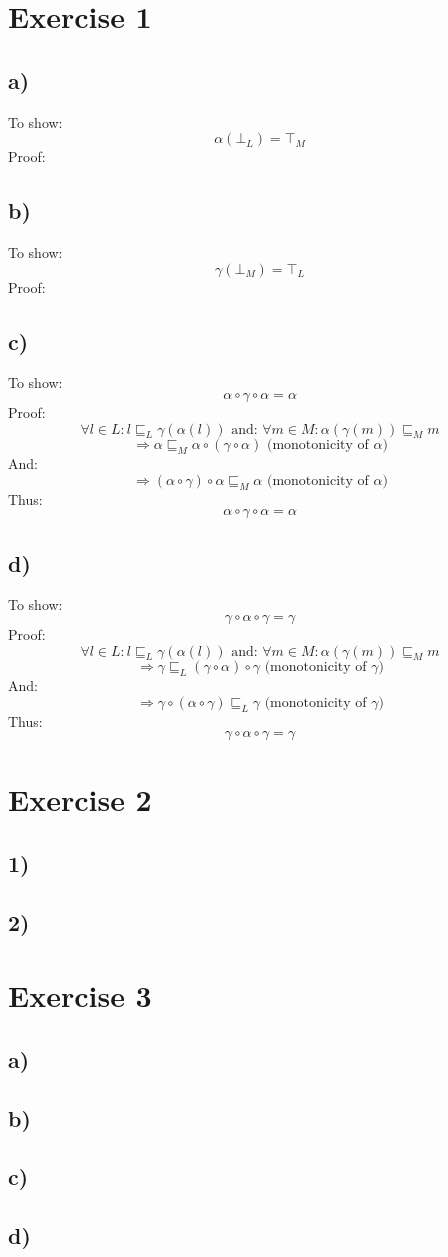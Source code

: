 \documentclass[fleqn,12pt]{article}
\begin{document}
\section*{Exercise 1}
\subsection*{a)}
To show:
$$\alpha(\bot_L) = \top_M$$
Proof:
\subsection*{b)}
To show:
$$\gamma(\bot_M) = \top_L$$
Proof:

\subsection*{c)}
To show:
$$\alpha \circ \gamma \circ \alpha = \alpha$$
Proof:
$$\forall l \in L: l \sqsubseteq_{L} \gamma(\alpha(l)) \text{ and: } \forall m \in M: \alpha(\gamma(m)) \sqsubseteq_{M} m$$
$$\Rightarrow \alpha \sqsubseteq_M \alpha \circ (\gamma \circ \alpha) \text{ (monotonicity of $\alpha$)}$$
And:
$$\Rightarrow (\alpha \circ \gamma) \circ \alpha \sqsubseteq_M \alpha \text{ (monotonicity of $\alpha$)}$$
Thus:
$$\alpha \circ \gamma \circ \alpha = \alpha$$
\subsection*{d)}
To show:
$$\gamma \circ \alpha \circ \gamma = \gamma$$
Proof:
$$\forall l \in L: l \sqsubseteq_{L} \gamma(\alpha(l)) \text{ and: } \forall m \in M: \alpha(\gamma(m)) \sqsubseteq_{M} m$$
$$\Rightarrow \gamma \sqsubseteq_L (\gamma \circ \alpha) \circ \gamma \text{ (monotonicity of $\gamma$)}$$
And:
$$\Rightarrow \gamma \circ (\alpha \circ \gamma) \sqsubseteq_L \gamma \text{ (monotonicity of $\gamma$)}$$
Thus:
$$\gamma \circ \alpha \circ \gamma = \gamma$$
\section*{Exercise 2}

\subsection*{1)}

\subsection*{2)}

\section*{Exercise 3}
\subsection*{a)}

\subsection*{b)}

\subsection*{c)}

\subsection*{d)}
\end{document}
